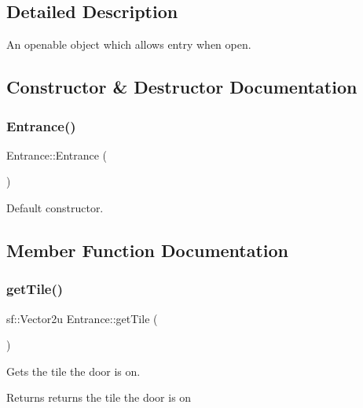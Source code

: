 \subsection{Detailed Description}
An openable object which allows entry when open. 

\subsection{Constructor \& Destructor Documentation}
\mbox{\label{class_entrance_a88cd27875093371afa47ac0f321716d7}} 
\subsubsection{\texorpdfstring{Entrance()}{Entrance()}}
{\footnotesize\ttfamily Entrance\+::\+Entrance (\begin{DoxyParamCaption}{ }\end{DoxyParamCaption})}



Default constructor. 



\subsection{Member Function Documentation}
\mbox{\label{class_entrance_a7f37b8990cf2926bfbcb9b3db36a23a2}} 
\subsubsection{\texorpdfstring{get\+Tile()}{getTile()}}
{\footnotesize\ttfamily sf\+::\+Vector2u Entrance\+::get\+Tile (\begin{DoxyParamCaption}{ }\end{DoxyParamCaption})}



Gets the tile the door is on. 

\begin{DoxyReturn}{Returns}
returns the tile the door is on 
\end{DoxyReturn}
\mbox{\label{class_entrance_a619bfbe5db84833a122667e3c3be288e}} 

